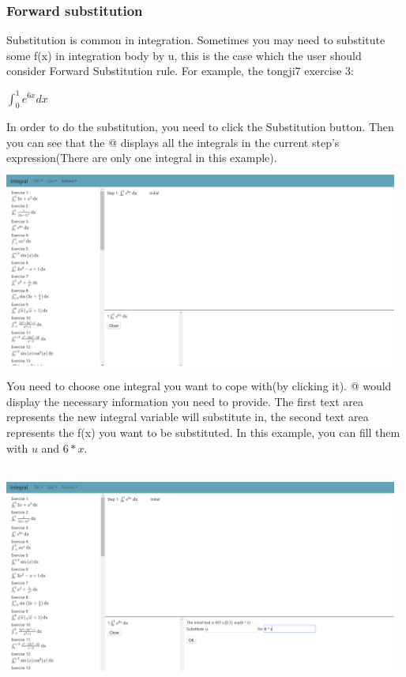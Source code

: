 \documentclass[titlepage]{article}
\makeatletter
\newcommand*{\rom}[1]{\expandafter\@slowromancap\romannumeral #1@}
\makeatother
\begin{document}
\subsubsection{Forward substitution}
Substitution is common in integration. Sometimes you may need to substitute some f(x) in integration body by u, this is the case which the user should consider Forward Substitution rule. For example, the tongji7 exercise 3:
\begin{center}
$\int_{0}^{1} e^{6x} dx$
\end{center}
In order to do the substitution, you need to click the \colorbox{mygray}{Substitution} button. Then you can see that the \rom{4} displays all the integrals in the current step's expression(There are only one integral in this example). \\
\includegraphics[width=13cm, height=7cm]{9.png}\\
You need to choose one integral you want to cope with(by clicking it). \rom{5} would display the necessary information you need to provide. The first text area represents the new integral variable will substitute in, the second text area represents the f(x) you want to be substituted. In this example, you can fill them with $u$ and $6*x$.\\\\
\includegraphics[width=13cm, height=7cm]{10.png}
\end{document}
